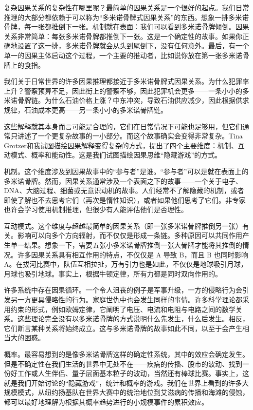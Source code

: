 复杂因果关系的复杂性在哪里呢？最简单的因果关系是一个很好的起点。我们日常推理的大部分都依赖于可以称为“多米诺骨牌式因果关系”的东西。想象一排多米诺骨牌，每一张都推倒下一张。机制就在表面：我们可以看到多米诺骨牌倾倒。因果关系非常简单：每张多米诺骨牌都推倒下一张。这是一个确定性的故事。如果你正确地设置了这一排，多米诺骨牌就会从头到尾倒下，没有任何意外。最后，有一个单一的因果主体启动这个过程，一个主要的推动者，比如说你放在第一张多米诺骨牌上的食指。

我们关于日常世界的许多因果推理都接近于多米诺骨牌式因果关系。为什么犯罪率上升？警察预算不足，因此街上的警察不够，因此犯罪机会更多——一条小小的多米诺骨牌链。为什么石油价格上涨？中东冲突，导致石油供应减少，因此根据供求规律，石油成本更高——另一条小小的多米诺骨牌链。

这些解释就其本身而言可能是合理的，它们在日常情况下可能也足够用，但它们通常只讲述了一个更复杂故事的一小部分。而这个故事确实会变得非常复杂。Tina Grotzer和我试图描绘因果解释变得复杂的方式，提出了四个主要维度：机制、互动模式、概率和能动性。这是我们试图描绘因果思维“隐藏游戏”的方式。

机制。这个维度涉及到因果故事中的“参与者”是谁。“参与者”可以是就在表面上的多米诺骨牌。然而，因果关系通常涉及一个表面之下的故事——一个关于电子、DNA、大脑过程、细菌或无意识动机的故事。人们经常不了解隐藏的机制，或者即使了解也不去思考它们（再次是惰性知识），或者如果他们思考了它们。非专家也许会学习使用机制推理，但很少有人能评估他们是否理性。

互动模式。这个维度与超越最简单的因果关系（即一张多米诺骨牌推倒另一张）有关。影响可以向多个方向辐射，而不仅仅是形成一条链。多种原因可以共同作用产生单一结果。想象一下，需要五张小多米诺骨牌推倒一张大骨牌才能将其推倒的情况。许多因果关系具有相互作用的特点，不仅仅是 A 导致 B，而且 B 也同时影响 A。在拔河比赛中，队伍互相拉扯，万有引力也是如此，不仅仅是地球吸引月球，月球也吸引地球。事实上，根据牛顿定律，所有力都是同时双向作用的。

许多系统中存在因果循环。一个令人沮丧的例子是军事升级，一方的侵略行为会引发另一方更具侵略性的行为。家庭世仇中也会发生同样的事情。许多科学理论都采用约束的形式，例如欧姆定律，它阐明了电压、电流和电阻与电路之间的数学关系。这些理论完全没有以多米诺骨牌的方式说明什么先发生，什么后发生。相反，它们断言某种关系将始终成立。这与多米诺骨牌的故事如此不同，以至于会产生相当大的困惑。

概率。最容易想到的是像多米诺骨牌这样的确定性系统，其中的效应会确定发生。但是不确定性在我们生活的世界中无处不在——疾病的传播、股市的波动、找到一份好工作或人生伴侣、量子层面基本粒子的波动，当然还有棒球比赛。事实上，这就是我们开始讨论的“隐藏游戏”，统计和概率的游戏。我们在世界上看到的许多大规模模式，从纽约扬基队在世界大赛中的统治地位到艾滋病的传播和海滩的侵蚀，都可以最好地理解为根据其概率趋势进行的小规模事件的累积效应。

